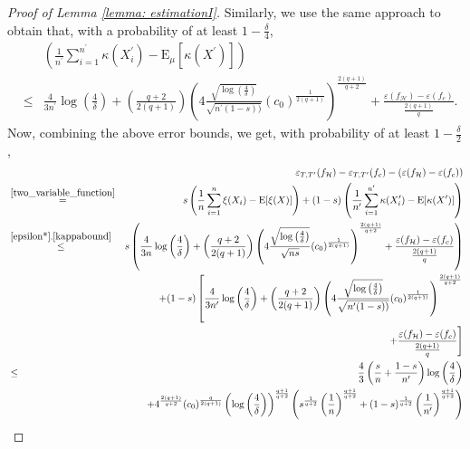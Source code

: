\documentclass{article}
\begin{document}
\begin{proof}[Proof of Lemma \ref{lemma: estimationI}]
Similarly, we use the same approach to obtain that, with a probability of at least $1-\frac{\delta}{4}$,
\begin{eqnarray}
\label{kappabound}
   && \left(\frac{1}{n^\prime}\sum_{i=1}^{n^\prime} \kappa(X^\prime_i) - \mathrm{E}_\mu[\kappa(X^\prime)]\right) \nonumber\\
    &\leq &\frac{4}{3n^\prime} \log\left(\frac{4}{\delta}\right) 
    + \left(\frac{q+2}{2(q+1)}\right)\left(4 \frac{\sqrt{\log\left(\frac{4}{\delta}\right)}}{\sqrt{n^\prime(1-s))}}  (c_0)^{\frac{1}{2(q+1)}}\right)^{\frac{2(q+1)}{q+2}} + 
 \frac{\varepsilon(f_\mathcal{H}) - \varepsilon(f_c)}{{\frac{2(q+1)}{q}}} . 
\end{eqnarray}
Now, combining the above error bounds, we get, with probability of at least $1-\frac{\delta}{2}$,
    \begin{eqnarray*}
         &&\varepsilon_{T, T'}(f_\mathcal{H}) - \varepsilon_{T, T'}(f_c) - (\varepsilon(f_\mathcal{H})- \varepsilon(f_c)) \\  &\stackrel{\eqref{two_variable_function}}{=}& s \left(\frac{1}{n}\sum_{i=1}^{n} \xi(X_i) - \mathrm{E}[\xi(X)]\right) + (1-s) \left(\frac{1}{n^\prime}\sum_{i=1}^{n^\prime}\kappa(X^\prime_i)- \mathrm{E}[\kappa(X^\prime)] \right)\\
          &\stackrel{\eqref{epsilon*}, \eqref{kappabound}}{\leq}& s \left(  \frac{4}{3n} \log\left(\frac{4}{\delta}\right) + \left(\frac{q+2}{2(q+1)}\right)\left(4 \frac{\sqrt{\log\left(\frac{4}{\delta}\right)}}{\sqrt{ns}}  (c_0)^{\frac{1}{2(q+1)}}\right)^{\frac{2(q+1)}{q+2}} + 
 \frac{\varepsilon(f_\mathcal{H}) - \varepsilon(f_c)}{{\frac{2(q+1)}{q}}}\right)\\
 && + (1-s)\left[\frac{4}{3n^\prime} \log\left(\frac{4}{\delta}\right) + \left(\frac{q+2}{2(q+1)}\right)\left(4 \frac{\sqrt{\log\left(\frac{4}{\delta}\right)}}{\sqrt{n^\prime(1-s))}}  (c_0)^{\frac{1}{2(q+1)}}\right)^{\frac{2(q+1)}{q+2}} \right.\\
 &&\quad\quad\quad\quad\quad  \left. + 
 \frac{\varepsilon(f_\mathcal{H}) - \varepsilon(f_c)}{{\frac{2(q+1)}{q}}}\right]\\
 &\leq& \frac{4}{3} \left(\frac{s}{n}+ \frac{1-s}{n^\prime}\right)  \log\left(\frac{4}{\delta}\right) \\
 &&+ 4^{\frac{2(q+1)}{q+2}}(c_0)^{\frac{q}{2(q+1)}}
 \left(\log\left(\frac{4}{\delta}\right)\right)^{\frac{q+1}{q+2}} \left(s^{\frac{1}{q+2}}\left(\frac{1}{n}\right)^{\frac{q+1}{q+2}}+(1-s)^{\frac{1}{q+2}}\left(\frac{1}{n^\prime}\right)^{\frac{q+1}{q+2}}\right) \\

\end{eqnarray*}
\end{proof}
\end{document}
